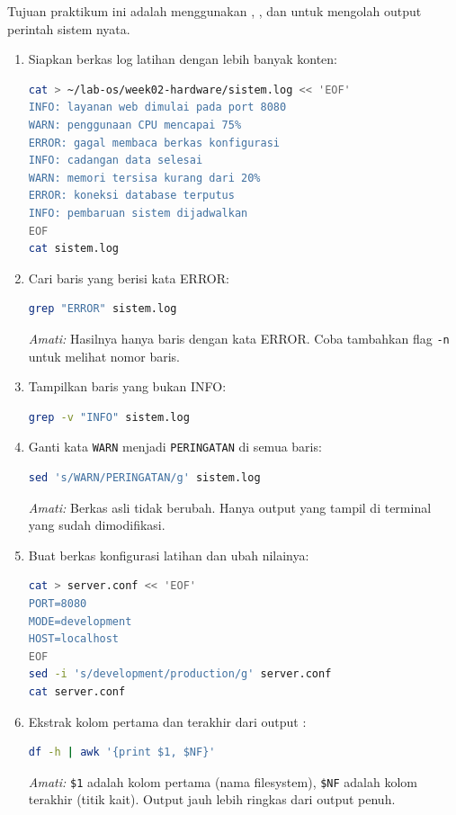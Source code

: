 Tujuan praktikum ini adalah menggunakan , , dan  untuk mengolah output perintah sistem nyata.

\begin{enumerate}
    \item Siapkan berkas log latihan dengan lebih banyak konten:
\begin{lstlisting}[language=bash, caption={Membuat berkas log latihan}]
cat > ~/lab-os/week02-hardware/sistem.log << 'EOF'
INFO: layanan web dimulai pada port 8080
WARN: penggunaan CPU mencapai 75%
ERROR: gagal membaca berkas konfigurasi
INFO: cadangan data selesai
WARN: memori tersisa kurang dari 20%
ERROR: koneksi database terputus
INFO: pembaruan sistem dijadwalkan
EOF
cat sistem.log
\end{lstlisting}

    \item Cari baris yang berisi kata ERROR:
\begin{lstlisting}[language=bash, caption={Filter baris ERROR}]
grep "ERROR" sistem.log
\end{lstlisting}
    \textit{Amati:} Hasilnya hanya baris dengan kata ERROR. Coba tambahkan flag \texttt{-n} untuk melihat nomor baris.

    \item Tampilkan baris yang bukan INFO:
\begin{lstlisting}[language=bash, caption={Tampilkan baris selain INFO}]
grep -v "INFO" sistem.log
\end{lstlisting}

    \item Ganti kata \texttt{WARN} menjadi \texttt{PERINGATAN} di semua baris:
\begin{lstlisting}[language=bash, caption={Substitusi teks dengan sed}]
sed 's/WARN/PERINGATAN/g' sistem.log
\end{lstlisting}
    \textit{Amati:} Berkas asli tidak berubah. Hanya output yang tampil di terminal yang sudah dimodifikasi.

    \item Buat berkas konfigurasi latihan dan ubah nilainya:
\begin{lstlisting}[language=bash, caption={Edit konfigurasi dengan sed}]
cat > server.conf << 'EOF'
PORT=8080
MODE=development
HOST=localhost
EOF
sed -i 's/development/production/g' server.conf
cat server.conf
\end{lstlisting}

    \item Ekstrak kolom pertama dan terakhir dari output :
\begin{lstlisting}[language=bash, caption={Ekstrak kolom dengan awk}]
df -h | awk '{print $1, $NF}'
\end{lstlisting}
    \textit{Amati:} \texttt{\$1} adalah kolom pertama (nama filesystem), \texttt{\$NF} adalah kolom terakhir (titik kait). Output jauh lebih ringkas dari output  penuh.


\end{enumerate}
